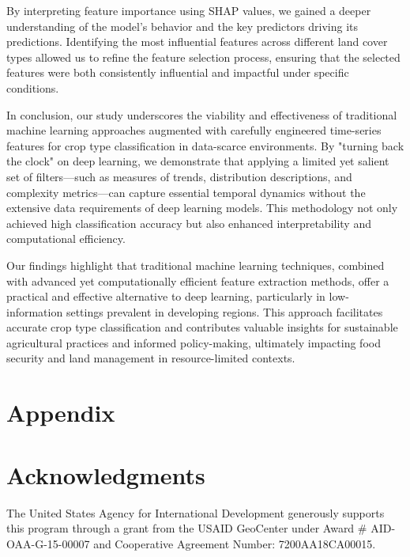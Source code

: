 \documentclass[journal]{IEEEtran}
\begin{document}
By interpreting feature importance using SHAP values, we gained a deeper understanding of the model's behavior and the key predictors driving its predictions. Identifying the most influential features across different land cover types allowed us to refine the feature selection process, ensuring that the selected features were both consistently influential and impactful under specific conditions.

In conclusion, our study underscores the viability and effectiveness of traditional machine learning approaches augmented with carefully engineered time-series features for crop type classification in data-scarce environments. By "turning back the clock" on deep learning, we demonstrate that applying a limited yet salient set of filters—such as measures of trends, distribution descriptions, and complexity metrics—can capture essential temporal dynamics without the extensive data requirements of deep learning models. This methodology not only achieved high classification accuracy but also enhanced interpretability and computational efficiency.

Our findings highlight that traditional machine learning techniques, combined with advanced yet computationally efficient feature extraction methods, offer a practical and effective alternative to deep learning, particularly in low-information settings prevalent in developing regions. This approach facilitates accurate crop type classification and contributes valuable insights for sustainable agricultural practices and informed policy-making, ultimately impacting food security and land management in resource-limited contexts.

 







\newpage
\clearpage
\begingroup
\renewcommand{\thepage}{A\arabic{page}}  %
\setcounter{page}{1}  %
\renewcommand{\thesection}{A\arabic{section}} %

\section*{Appendix}

\section{Acknowledgments}
The United States Agency for International Development generously supports this program through a grant from the USAID GeoCenter under Award \# AID-OAA-G-15-00007 and Cooperative Agreement Number: 7200AA18CA00015.
\end{document}
